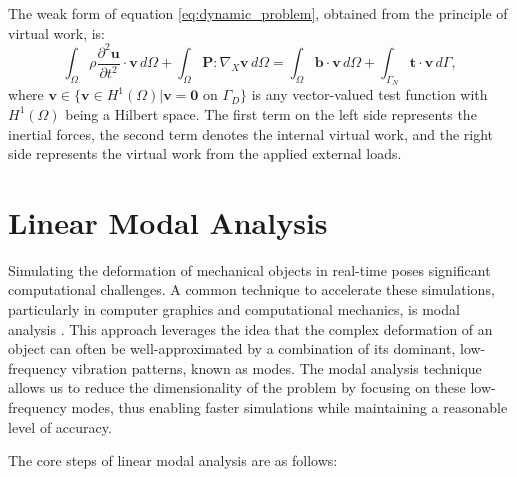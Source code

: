 The weak form of equation \eqref{eq:dynamic_problem}, obtained from the principle of virtual work, is:
\begin{equation}
    \int_{\Omega} \rho \frac{\partial^2 \bm{u}}{\partial t^2} \cdot \bm{v} \, d\Omega + \int_{\Omega} \bm{P} : \nabla_X \bm{v} \, d\Omega = \int_{\Omega} \bm{b} \cdot \bm{v} \, d\Omega + \int_{\Gamma_N} \bm{t} \cdot \bm{v} \, d\Gamma,
\label{eq:weak_form}
\end{equation}
where $\bm{v} \in \{\bm{v} \in H^1(\Omega) | \bm{v} = \bm{0} \text{ on } \Gamma_D\}$ is any vector-valued test function with $H^1(\Omega)$ being a Hilbert space. The first term on the left side represents the inertial forces, the second term denotes the internal virtual work, and the right side represents the virtual work from the applied external loads.


\section{Linear Modal Analysis}
\label{sec:linear_modes}

Simulating the deformation of mechanical objects in real-time poses significant computational challenges. A common technique to accelerate these simulations, particularly in computer graphics and computational mechanics, is modal analysis \cite{Pentland_Williams_1989}. This approach leverages the idea that the complex deformation of an object can often be well-approximated by a combination of its dominant, low-frequency vibration patterns, known as modes. The modal analysis technique allows us to reduce the dimensionality of the problem by focusing on these low-frequency modes, thus enabling faster simulations while maintaining a reasonable level of accuracy.


The core steps of linear modal analysis are as follows:

